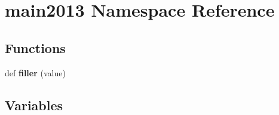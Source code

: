 \hypertarget{namespacemain2013}{}\section{main2013 Namespace Reference}
\label{namespacemain2013}
\subsection*{Functions}
\begin{DoxyCompactItemize}
\item 
def {\bfseries filler} (value)\hypertarget{namespacemain2013_a0dc84400901b140a44b086ee0d9175a3}{}\label{namespacemain2013_a0dc84400901b140a44b086ee0d9175a3}

\end{DoxyCompactItemize}
\subsection*{Variables}
